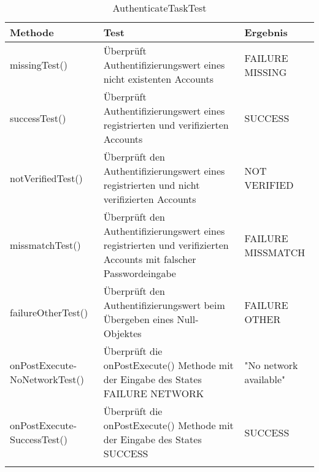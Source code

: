 \begin{longtable}{p{} | p{} | p{}}
\hline
  \textbf{Methode} & \textbf{Test} & \textbf{Ergebnis}\\
  \hline
  missingTest() & Überprüft Authentifizierungswert eines nicht existenten Accounts & FAILURE MISSING \\
  \hline
  successTest() & Überprüft Authentifizierungswert eines registrierten und verifizierten Accounts & SUCCESS \\
  \hline
  notVerifiedTest() & Überprüft den Authentifizierungswert eines registrierten und nicht verifizierten Accounts & NOT VERIFIED \\
  \hline
  missmatchTest() & Überprüft den Authentifizierungswert eines registrierten und verifizierten Accounts mit falscher Passwordeingabe & FAILURE MISSMATCH \\
  \hline
  failureOtherTest() & Überprüft den Authentifizierungswert beim Übergeben eines Null-Objektes & FAILURE OTHER \\
  \hline
   onPostExecute- \newline NoNetworkTest() & Überprüft die onPostExecute() Methode mit der Eingabe des States FAILURE NETWORK & "No network available" \\
  \hline
  onPostExecute- \newline SuccessTest() & Überprüft die onPostExecute() Methode mit der Eingabe des States SUCCESS & SUCCESS \\
  \hline
  \caption{AuthenticateTaskTest}
 \end{longtable}
 
